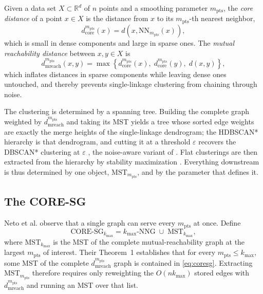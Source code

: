 \documentclass{ieeeaccess}
\newcommand{\kmax}{k_{\max}}
\newcommand{\mpts}{m_{\mathrm{pts}}}
\newcommand{\mrd}{d_{\mathrm{mreach}}}
\newcommand{\coredist}{d_{\mathrm{core}}}
\begin{document}
Given a data set $X \subset \mathbb{R}^d$ of $n$ points and a smoothing
parameter $\mpts$, the \emph{core distance} of a point $x \in X$ is the distance
from $x$ to its $\mpts$-th nearest neighbor,
\begin{equation}
\coredist^{\mpts}(x) = d(x, \mathrm{NN}_{\mpts}(x)),
\end{equation}
which is small in dense components and large in sparse ones. The
\emph{mutual reachability distance} \cite{hdbscan} between $x, y \in X$ is
\begin{equation}
\label{eq:mrd}
\mrd^{\mpts}(x,y) = \max\!\left\{\coredist^{\mpts}(x),\;
\coredist^{\mpts}(y),\; d(x,y)\right\},
\end{equation}
which inflates distances in sparse components while leaving dense ones
untouched, and thereby prevents single-linkage clustering from chaining through
noise.

The clustering is determined by a spanning tree. Building the complete graph weighted
by $\mrd^{\mpts}$ and taking its MST yields a tree whose sorted edge weights are
exactly the merge heights of the single-linkage dendrogram; the HDBSCAN*
hierarchy is that dendrogram, and cutting it at a threshold $\varepsilon$
recovers the DBSCAN* clustering at $\varepsilon$ \cite{hdbscan_tkdd}, the
noise-aware variant of \cite{dbscan}. Flat clusterings are then extracted from
the hierarchy by stability maximization \cite{fosc}. Everything downstream is
thus determined by one object, $\mathrm{MST}_{\mpts}$, and by the parameter that
defines it.

\subsection{The CORE-SG}

Neto et al. \cite{coresg} observe that a single graph can serve every $\mpts$ at
once. Define
\begin{equation}
\label{eq:coresg}
\mathrm{CORE\text{-}SG}_{\kmax} = \kmax\text{-}\mathrm{NNG} \;\cup\;
\mathrm{MST}_{\kmax},
\end{equation}
where $\mathrm{MST}_{\kmax}$ is the MST of the complete mutual-reachability
graph at the largest $\mpts$ of interest. Their Theorem~1 establishes that for
every $\mpts \le \kmax$, some MST of the complete $\mrd^{\mpts}$ graph is
contained in \eqref{eq:coresg}. Extracting $\mathrm{MST}_{\mpts}$ therefore
requires only reweighting the $O(n\kmax)$ stored edges with $\mrd^{\mpts}$ and
running an MST over that list.
\end{document}
